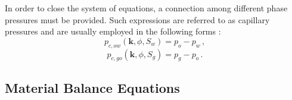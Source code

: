 \documentclass[authoryear,preprint,review,12pt]{elsarticle}
\begin{document}
In order to close the system of equations, a connection among different phase pressures must be provided. Such expressions are referred to as capillary pressures and are usually employed in the following forms \citep{aziz1979petroleum}:
\begin{equation}\label{eq: capillary_ow}
p_{c,ow}\left(\mathbf{k},\phi,S_w\right)=p_o-p_w \, ,
\end{equation}
\begin{equation}\label{eq: capillary_og}
p_{c,go}\left(\mathbf{k},\phi,S_g\right)=p_g-p_o \, .
\end{equation}



%
%
%


\subsection{Material Balance Equations}
\end{document}
